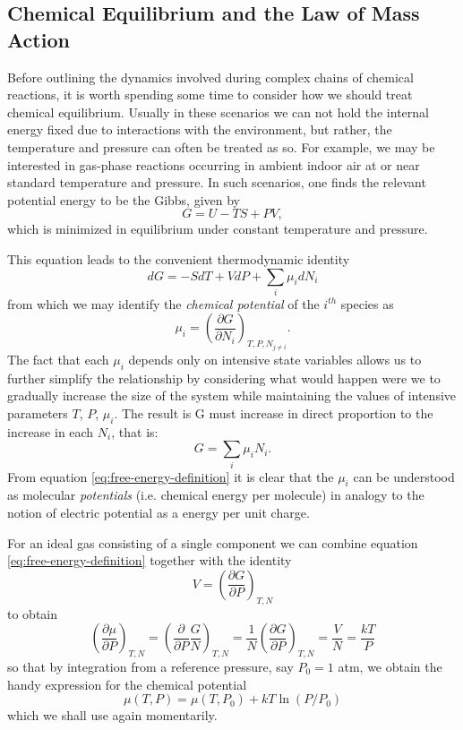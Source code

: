 \subsection{Chemical Equilibrium and the Law of Mass Action}

Before outlining the dynamics involved during complex chains of chemical reactions, it is worth spending some time to consider how we should treat chemical equilibrium. Usually in these scenarios we can not hold the internal energy fixed due to interactions with the environment, but rather, the temperature and pressure can often be treated as so. For example, we may be interested in gas-phase reactions occurring in ambient indoor air at or near standard temperature and pressure. In such scenarios, one finds the relevant potential energy to be the Gibbs, given by
\begin{equation}
  G = U - TS + PV,
\end{equation}
which is minimized in equilibrium under constant temperature and pressure.

This equation leads to the convenient thermodynamic identity
\begin{equation}
  dG = -SdT + VdP + \sum_i \mu_i dN_i
\end{equation}
from which we may identify the \textit{chemical potential} of the $i^{th}$ species as
\begin{equation}
  \mu_i  = \left(\frac{\partial G}{\partial N_i} \right)_{T,P,N_{j\neq i}}.
\end{equation}
The fact that each $\mu_i$ depends only on intensive state variables allows us to further simplify the relationship by considering what would happen were we to gradually increase the size of the system while maintaining the values of intensive parameters $T$, $P$, $\mu_i$. The result is G must increase in direct proportion to the increase in each $N_i$, that is:
\begin{equation}
  \label{eq:free-energy-definition}
  G = \sum_i \mu_i N_i.
\end{equation}
From equation \ref{eq:free-energy-definition} it is clear that the $\mu_i$ can be understood as molecular \textit{potentials} (i.e. chemical energy per molecule) in analogy to the notion of electric potential as a energy per unit charge.


For an ideal gas consisting of a single component we can combine equation \ref{eq:free-energy-definition} together with the identity
\begin{equation}
  V = \left(\frac{\partial G}{\partial P}\right)_{T,N}
\end{equation}
to obtain
\begin{equation}
  \left(\frac{\partial \mu}{\partial P}\right)_{T,N} = \left(\frac{\partial}{\partial P}\frac{G}{N}\right)_{T,N} = \frac{1}{N}\left(\frac{\partial G}{\partial P} \right)_{T,N} = \frac{V}{N} = \frac{kT}{P}
\end{equation}
so that by integration from a reference pressure, say $P_0= 1$ atm, we obtain the handy expression for the chemical potential
\begin{equation}
  \label{eq:mu-ideal}
  \mu(T,P) = \mu(T,P_0) + kT\ln(P/P_0)
\end{equation}
which we shall use again momentarily.


